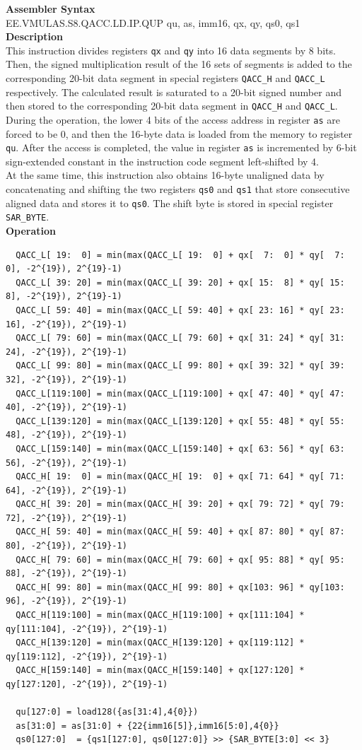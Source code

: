 \textbf{Assembler Syntax} \\
EE.VMULAS.S8.QACC.LD.IP.QUP qu, as, imm16, qx, qy, qs0, qs1 \\
\textbf{Description} \\
This instruction divides registers \lstinline{qx} and \lstinline{qy} into 16 data segments by 8 bits. Then, the signed multiplication result of the 16 sets of segments is added to the corresponding 20-bit data segment in special registers \lstinline{QACC_H} and \lstinline{QACC_L} respectively. The calculated result is saturated to a 20-bit signed number and then stored to the corresponding 20-bit data segment in \lstinline{QACC_H} and \lstinline{QACC_L}.\\
During the operation, the lower 4 bits of the access address in register \lstinline{as} are forced to be 0, and then the 16-byte data is loaded from the memory to register \lstinline{qu}. After the access is completed, the value in register \lstinline{as} is incremented by 6-bit sign-extended constant in the instruction code segment left-shifted by 4.\\
At the same time, this instruction also obtains 16-byte unaligned data by concatenating and shifting the two registers \lstinline{qs0} and \lstinline{qs1} that store consecutive aligned data and stores it to \lstinline{qs0}. The shift byte is stored in special register \lstinline{SAR_BYTE}.\\
\textbf{Operation}
\begin{lstlisting}
  QACC_L[ 19:  0] = min(max(QACC_L[ 19:  0] + qx[  7:  0] * qy[  7:  0], -2^{19}), 2^{19}-1)
  QACC_L[ 39: 20] = min(max(QACC_L[ 39: 20] + qx[ 15:  8] * qy[ 15:  8], -2^{19}), 2^{19}-1)
  QACC_L[ 59: 40] = min(max(QACC_L[ 59: 40] + qx[ 23: 16] * qy[ 23: 16], -2^{19}), 2^{19}-1)
  QACC_L[ 79: 60] = min(max(QACC_L[ 79: 60] + qx[ 31: 24] * qy[ 31: 24], -2^{19}), 2^{19}-1)
  QACC_L[ 99: 80] = min(max(QACC_L[ 99: 80] + qx[ 39: 32] * qy[ 39: 32], -2^{19}), 2^{19}-1)
  QACC_L[119:100] = min(max(QACC_L[119:100] + qx[ 47: 40] * qy[ 47: 40], -2^{19}), 2^{19}-1)
  QACC_L[139:120] = min(max(QACC_L[139:120] + qx[ 55: 48] * qy[ 55: 48], -2^{19}), 2^{19}-1)
  QACC_L[159:140] = min(max(QACC_L[159:140] + qx[ 63: 56] * qy[ 63: 56], -2^{19}), 2^{19}-1)
  QACC_H[ 19:  0] = min(max(QACC_H[ 19:  0] + qx[ 71: 64] * qy[ 71: 64], -2^{19}), 2^{19}-1)
  QACC_H[ 39: 20] = min(max(QACC_H[ 39: 20] + qx[ 79: 72] * qy[ 79: 72], -2^{19}), 2^{19}-1)
  QACC_H[ 59: 40] = min(max(QACC_H[ 59: 40] + qx[ 87: 80] * qy[ 87: 80], -2^{19}), 2^{19}-1)
  QACC_H[ 79: 60] = min(max(QACC_H[ 79: 60] + qx[ 95: 88] * qy[ 95: 88], -2^{19}), 2^{19}-1)
  QACC_H[ 99: 80] = min(max(QACC_H[ 99: 80] + qx[103: 96] * qy[103: 96], -2^{19}), 2^{19}-1)
  QACC_H[119:100] = min(max(QACC_H[119:100] + qx[111:104] * qy[111:104], -2^{19}), 2^{19}-1)
  QACC_H[139:120] = min(max(QACC_H[139:120] + qx[119:112] * qy[119:112], -2^{19}), 2^{19}-1)
  QACC_H[159:140] = min(max(QACC_H[159:140] + qx[127:120] * qy[127:120], -2^{19}), 2^{19}-1)

  qu[127:0] = load128({as[31:4],4{0}})
  as[31:0] = as[31:0] + {22{imm16[5]},imm16[5:0],4{0}}
  qs0[127:0]  = {qs1[127:0], qs0[127:0]} >> {SAR_BYTE[3:0] << 3}
\end{lstlisting}

